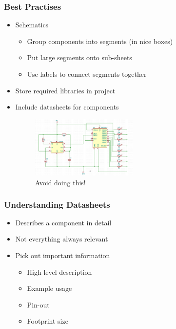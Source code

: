 \documentclass{beamer}
\begin{document}


\begin{frame}
  \frametitle{Best Practises}
  \begin{itemize}
    \item Schematics
    \begin{itemize}
      \item Group components into segments (in nice boxes)
      \item Put large segments onto sub-sheets
      \item Use labels to connect segments together
    \end{itemize}
    
    \item Store required libraries in project
    \item Include datasheets for components

    \begin{figure}[H]
    \centering
    \includegraphics[width=0.50\textwidth]{images/kicad_schematic_bad.png}
    \caption{Avoid doing this!}
  \end{figure}
  \end{itemize}
\end{frame}


\begin{frame}
  \frametitle{Understanding Datasheets}
  \begin{itemize}
    \item Describes a component in detail
    \item Not everything always relevant
    \item Pick out important information
    \begin{itemize}
      \item High-level description
      \item Example usage
      \item Pin-out
      \item Footprint size
    \end{itemize}
  \end{itemize}
\end{frame}
\end{document}

